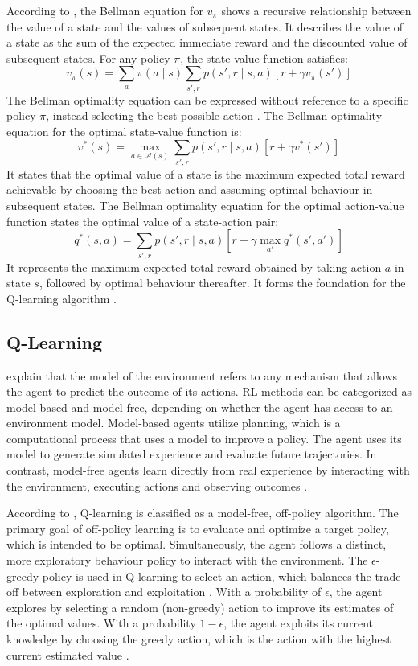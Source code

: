 \documentclass[
  authoryear,
  preprint]{elsarticle}
\begin{document}
According to \citet{SuttonBarto2020}, the Bellman equation for \(v_\pi\)
shows a recursive relationship between the value of a state and the
values of subsequent states. It describes the value of a state as the
sum of the expected immediate reward and the discounted value of
subsequent states. For any policy \(\pi\), the state-value function
satisfies: \[
v_\pi(s) = \sum_a \pi(a \mid s) \sum_{s',r} p(s',r \mid s,a)\left[ r + \gamma v_\pi(s') \right]
\] The Bellman optimality equation can be expressed without reference to
a specific policy \(\pi\), instead selecting the best possible action
\citep{SuttonBarto2020}. The Bellman optimality equation for the optimal
state-value function is: \[
v^*(s) = \max_{a \in \mathcal{A}(s)} \sum_{s',r} p(s',r \mid s,a)\left[ r + \gamma v^*(s') \right]
\] It states that the optimal value of a state is the maximum expected
total reward achievable by choosing the best action and assuming optimal
behaviour in subsequent states. The Bellman optimality equation for the
optimal action-value function states the optimal value of a state-action
pair: \[
q^*(s,a) = \sum_{s',r} p(s',r \mid s,a)\left[ r + \gamma \max_{a'} q^*(s',a') \right]
\] It represents the maximum expected total reward obtained by taking
action \(a\) in state \(s\), followed by optimal behaviour thereafter.
It forms the foundation for the Q-learning algorithm
\citep{SuttonBarto2020}.

\subsection{Q-Learning}\label{q-learning}

\citet{SuttonBarto2020} explain that the model of the environment refers
to any mechanism that allows the agent to predict the outcome of its
actions. RL methods can be categorized as model-based and model-free,
depending on whether the agent has access to an environment model.
Model-based agents utilize planning, which is a computational process
that uses a model to improve a policy. The agent uses its model to
generate simulated experience and evaluate future trajectories. In
contrast, model-free agents learn directly from real experience by
interacting with the environment, executing actions and observing
outcomes \citep{SuttonBarto2020}.

According to \citet{SuttonBarto2020}, Q-learning is classified as a
model-free, off-policy algorithm. The primary goal of off-policy
learning is to evaluate and optimize a target policy, which is intended
to be optimal. Simultaneously, the agent follows a distinct, more
exploratory behaviour policy to interact with the environment. The
\(\epsilon\)-greedy policy is used in Q-learning to select an action,
which balances the trade-off between exploration and exploitation
\citep{SuttonBarto2020}. With a probability of \(\epsilon\), the agent
explores by selecting a random (non-greedy) action to improve its
estimates of the optimal values. With a probability \(1 - \epsilon\),
the agent exploits its current knowledge by choosing the greedy action,
which is the action with the highest current estimated value
\citep{SuttonBarto2020}.
\end{document}
